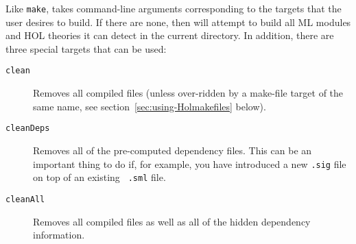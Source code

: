 Like {\tt make}, \holmake{} takes command-line arguments corresponding
to the targets that the user desires to build.  If there are none,
then \holmake{} will attempt to build all ML modules and HOL theories
it can detect in the current directory.  In addition, there are three
special targets that can be used:
\begin{description}
\item[{\tt clean}] Removes all compiled files (unless over-ridden by a
  make-file target of the same name, see
  section~\ref{sec:using-Holmakefiles} below).
\item [{\tt cleanDeps}] Removes all of the pre-computed dependency
  files.  This can be an important thing to do if, for example, you
  have introduced a new {\tt .sig} file on top of an existing {\tt
    .sml} file.
\item [{\tt cleanAll}] Removes all compiled files as well as all of
  the hidden dependency information.
\end{description}

